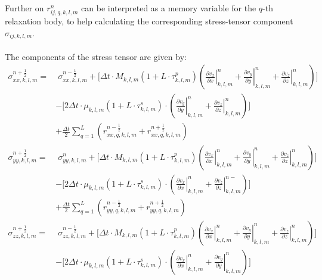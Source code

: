 \documentclass[pdftex,a4paper,parskip,listof=totoc,bibliography=totoc,onehalfspacing,12pt]{scrreprt}
\begin{document}
Further on $r_{ij,q,k,l,m}^{n}$ can be interpreted as a memory variable for the $q$-th relaxation body, to help calculating the corresponding stress-tensor component $\sigma_{ij,k,l,m}$.
\\\\The components of the stress tensor are given by:
\begin{align*}
	\sigma_{xx,k,l,m}^{n+\frac{1}{2}} =& \;\sigma_{xx,k,l,m}^{n-\frac{1}{2}}+ \Bigg[ \Delta t \cdot M_{k,l,m} \left(1+L\cdot \tau^p_{k,l,m}\right)\left( \left.\frac{\partial v_x}{\partial x}\right\rvert_{k,l,m}^{n} + \left.\frac{\partial v_y}{\partial y}\right\rvert_{k,l,m}^{n} + \left.\frac{\partial v_z}{\partial z}\right\rvert_{k,l,m}^{n} \right)\Bigg]  \\
	&- \Bigg[ 2 \Delta t \cdot \mu_{k,l,m} \left(1+L\cdot \tau^s_{k,l,m}\right)\cdot \left( \left.\frac{\partial v_y}{\partial y}\right\rvert_{k,l,m}^{n} + \left.\frac{\partial v_z}{\partial z}\right\rvert_{k,l,m}^{n} \right)\Bigg] \\
	&+ \frac{\Delta t}{2} \sum _{q=1}^{L} \left( r_{xx,q,k,l,m}^{n-\frac{1}{2}}+ r_{xx,q,k,l,m}^{n+\frac{1}{2}}\right) \\
	\sigma_{yy,k,l,m}^{n+\frac{1}{2}} =&\;\sigma_{yy,k,l,m}^{n}+ \Bigg[ \Delta t \cdot M_{k,l,m} \left(1+L\cdot \tau^p_{k,l,m}\right)\left( \left.\frac{\partial v_x}{\partial x}\right\rvert_{k,l,m}^{n} + \left.\frac{\partial v_y}{\partial y}\right\rvert_{k,l,m}^{n} + \left.\frac{\partial v_z}{\partial z}\right\rvert_{k,l,m}^{n} \right)\Bigg]  \\
	&- \Bigg[ 2 \Delta t \cdot \mu_{k,l,m} \left(1+L\cdot \tau^s_{k,l,m}\right)\cdot \left( \left.\frac{\partial v_x}{\partial x}\right\rvert_{k,l,m}^{n} + \left.\frac{\partial v_z}{\partial z}\right\rvert_{k,l,m}^{n-} \right)\Bigg] \\
	&+ \frac{\Delta t}{2} \sum _{q=1}^{L} \left( r_{yy,q,k,l,m}^{n-\frac{1}{2}}+ r_{yy,q,k,l,m}^{n+\frac{1}{2}}\right)\\ 
	\sigma_{zz,k,l,m}^{n+\frac{1}{2}} =&\;\sigma_{zz,k,l,m}^{n-\frac{1}{2}}+ \Bigg[ \Delta t \cdot M_{k,l,m} \left(1+L\cdot \tau^p_{k,l,m}\right)\left( \left.\frac{\partial v_x}{\partial x}\right\rvert_{k,l,m}^{n}+ \left.\frac{\partial v_y}{\partial y}\right\rvert_{k,l,m}^{n} + \left.\frac{\partial v_z}{\partial z}\right\rvert_{k,l,m}^{n} \right)\Bigg]  \\
	&- \Bigg[ 2 \Delta t \cdot \mu_{k,l,m} \left(1+L\cdot \tau^s_{k,l,m}\right)\cdot \left( \left.\frac{\partial v_x}{\partial x}\right\rvert_{k,l,m}^{n} + \left.\frac{\partial v_y}{\partial y}\right\rvert_{k,l,m}^{n} \right)\Bigg] \\

\end{align*}
\end{document}
